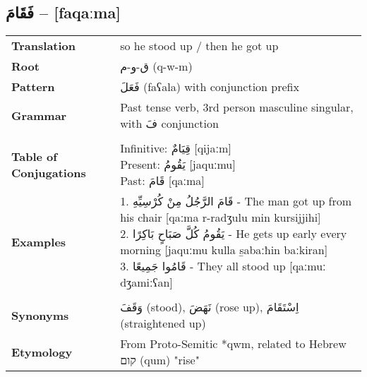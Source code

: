 \documentclass[letter,12pt]{article}
\begin{document}
\subsection{\textarabic{فَقَامَ} – [faqaːma]}
\begin{tabular}{p{3cm}p{10cm}}
\toprule
\textbf{Translation} & so he stood up / then he got up \\
\textbf{Root} & \textarabic{ق-و-م} (q-w-m) \\
\textbf{Pattern} & \textarabic{فَعَلَ} (faʕala) with conjunction prefix \\
\textbf{Grammar} & Past tense verb, 3rd person masculine singular, with \textarabic{فَ} conjunction \\
\midrule \\
\textbf{Table of Conjugations} & \makecell[l]{
Infinitive: \textarabic{قِيَامٌ} [qijaːm] \\
Present: \textarabic{يَقُومُ} [jaquːmu] \\
Past: \textarabic{قَامَ} [qaːma]
} \\
\midrule
\textbf{Examples} & \makecell[l]{\parbox{9.5cm}{
1. \textarabic{قَامَ الرَّجُلُ مِنْ كُرْسِيِّهِ} - The man got up from his chair [qaːma r-radʒulu min kursijjihi]\\
2. \textarabic{يَقُومُ كُلَّ صَبَاحٍ بَاكِرًا} - He gets up early every morning [jaquːmu kulla s̱abaːħin baːkiran]\\
3. \textarabic{قَامُوا جَمِيعًا} - They all stood up [qaːmuː dʒamiːʕan]
}} \\
\midrule \\
\textbf{Synonyms} & \textarabic{وَقَفَ} (stood), \textarabic{نَهَضَ} (rose up), \textarabic{اِسْتَقَامَ} (straightened up) \\
\textbf{Etymology} & From Proto-Semitic *qwm, related to Hebrew \texthebrew{קום} (qum) "rise" \\
\bottomrule
\end{tabular}
\end{document}
